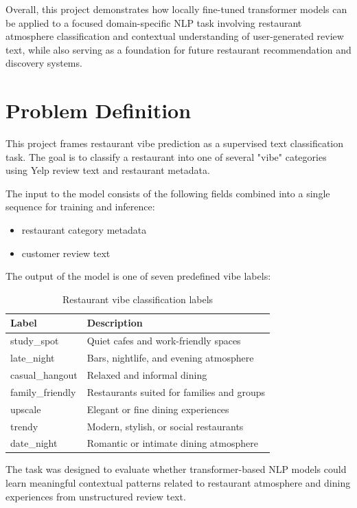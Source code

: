 \documentclass[11pt]{article}
\begin{document}
\medbreak Overall, this project demonstrates how locally fine-tuned transformer models can be applied to a focused 
domain-specific NLP task involving restaurant atmosphere classification and contextual understanding of user-generated 
review text, while also serving as a foundation for future restaurant recommendation and discovery systems.


\section{Problem Definition}

This project frames restaurant vibe prediction as a supervised text classification task. The goal is to classify a 
restaurant into one of several "vibe" categories using Yelp review text and restaurant metadata.

\medbreak \noindent The input to the model consists of the following fields combined into a single sequence for training 
and inference:
\begin{itemize}[noitemsep, topsep=0pt]
    \item restaurant category metadata
    \item customer review text
\end{itemize}


\medbreak \noindent The output of the model is one of seven predefined vibe labels:
\begin{table}[h]
\centering
\begin{tabular}{ll}
\toprule
Label & Description \\
\midrule
study\_spot & Quiet cafes and work-friendly spaces \\
late\_night & Bars, nightlife, and evening atmosphere \\
casual\_hangout & Relaxed and informal dining \\
family\_friendly & Restaurants suited for families and groups \\
upscale & Elegant or fine dining experiences \\
trendy & Modern, stylish, or social restaurants \\
date\_night & Romantic or intimate dining atmosphere \\
\bottomrule
\end{tabular}
\caption{Restaurant vibe classification labels}
\end{table}


\break 
The task was designed to evaluate whether transformer-based NLP models could learn meaningful contextual patterns related 
to restaurant atmosphere and dining experiences from unstructured review text.
\end{document}
